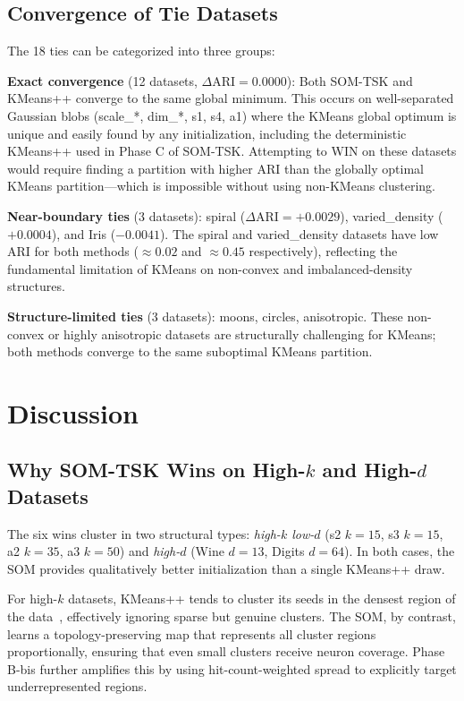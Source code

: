\documentclass[journal]{IEEEtran}
\begin{document}
\subsection{Convergence of Tie Datasets}

The 18 ties can be categorized into three groups:

\textbf{Exact convergence} (12 datasets, $\Delta\mathrm{ARI} = 0.0000$): Both SOM-TSK and KMeans++ converge to the same global minimum. This occurs on well-separated Gaussian blobs (scale\_*, dim\_*, s1, s4, a1) where the KMeans global optimum is unique and easily found by any initialization, including the deterministic KMeans++ used in Phase C of SOM-TSK. Attempting to WIN on these datasets would require finding a partition with higher ARI than the globally optimal KMeans partition—which is impossible without using non-KMeans clustering.

\textbf{Near-boundary ties} (3 datasets): spiral ($\Delta\mathrm{ARI} = +0.0029$), varied\_density ($+0.0004$), and Iris ($-0.0041$). The spiral and varied\_density datasets have low ARI for both methods ($\approx 0.02$ and $\approx 0.45$ respectively), reflecting the fundamental limitation of KMeans on non-convex and imbalanced-density structures.

\textbf{Structure-limited ties} (3 datasets): moons, circles, anisotropic. These non-convex or highly anisotropic datasets are structurally challenging for KMeans; both methods converge to the same suboptimal KMeans partition.

\section{Discussion}
\label{sec:discussion}

\subsection{Why SOM-TSK Wins on High-$k$ and High-$d$ Datasets}

The six wins cluster in two structural types: \textit{high-$k$ low-$d$} (s2 $k=15$, s3 $k=15$, a2 $k=35$, a3 $k=50$) and \textit{high-$d$} (Wine $d=13$, Digits $d=64$). In both cases, the SOM provides qualitatively better initialization than a single KMeans++ draw.

For high-$k$ datasets, KMeans++ tends to cluster its seeds in the densest region of the data~\cite{brunsch2013bad}, effectively ignoring sparse but genuine clusters. The SOM, by contrast, learns a topology-preserving map that represents all cluster regions proportionally, ensuring that even small clusters receive neuron coverage. Phase B-bis further amplifies this by using hit-count-weighted spread to explicitly target underrepresented regions.
\end{document}
